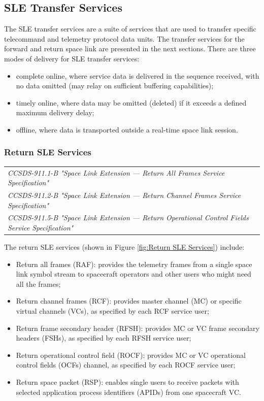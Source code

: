 \subsection{SLE Transfer Services}

The SLE transfer services are a suite of services that are used to transfer specific telecommand and telemetry protocol data units. The transfer services for the forward and return space link are presented in the next sections. There are three modes of delivery for SLE transfer services:

\begin{itemize}
\item complete online, where service data is delivered in the sequence received, with no data omitted (may relay on sufficient buffering capabilities);
\item timely online, where data may be omitted (deleted) if it exceeds a defined maximum delivery delay;
\item offline, where data is transported outside a real-time space link session.
\end{itemize}

\subsubsection{Return SLE Services}

\begin{tabular}{l}
\textit{CCSDS-911.1-B "Space Link Extension — Return All Frames Service Specification" \cite{CCSDS-911.1-B}} \\
\textit{CCSDS-911.2-B "Space Link Extension — Return Channel Frames Service Specification" \cite{CCSDS-911.2-B}} \\
\textit{CCSDS-911.5-B "Space Link Extension — Return Operational Control Fields Service Specification" \cite{CCSDS-911.5-B}} \\
\end{tabular}

The return SLE services (shown in Figure \ref{fig:Return SLE Services}) include: 

\begin{itemize}
\item Return all frames (RAF): provides the telemetry frames from a single space link symbol stream to spacecraft operators and other users who might need all the frames;
\item Return channel frames (RCF): provides master channel (MC) or specific virtual channels (VCs), as specified by each RCF service user;
\item Return frame secondary header (RFSH): provides MC or VC frame secondary headers (FSHs), as specified by each RFSH service user; 
\item Return operational control field (ROCF): provides MC or VC operational control fields (OCFs) channel, as specified by each ROCF service user; 
\item Return space packet (RSP): enables single users to receive packets with selected application process identifiers (APIDs) from one spacecraft VC.
\end{itemize}

